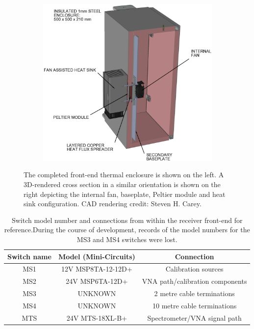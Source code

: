 \begin{figure}
\begin{subfigure}{0.49\textwidth}
        \includegraphics[width=\textwidth]{enclosure_cross_section}
    \end{subfigure}
    \caption{The completed front-end thermal enclosure is shown on the left. A 3D-rendered cross section in a similar orientation is shown on the right depicting the internal fan, baseplate, Peltier module and heat sink configuration. CAD rendering credit: Steven H. Carey.}
    \label{fig:enclose_supp}
\end{figure}


\begin{table}
    \begin{center}
    \begin{tabular}{ |c|c|c| }
    \hline
    Switch name & Model (Mini-Circuits) & Connection \\
    \hline
    MS1 & 12V MSP8TA-12-12D+ & Calibration sources \\
    MS2 & 24V MSP6TA-12D+& VNA path/calibration components \\
    MS3 & UNKNOWN & 2 metre cable terminations \\
    MS4 & UNKNOWN & 10 metre cable terminations \\
    MTS & 24V MTS-18XL-B+ & Spectrometer/VNA signal path \\
    \hline
    \end{tabular}
    \caption{Switch model number and connections from within the receiver front-end for reference.During the course of development, records of the model numbers for the MS3 and MS4 switches were lost.}
    \label{tab:switches}
    \end{center}
\end{table}

